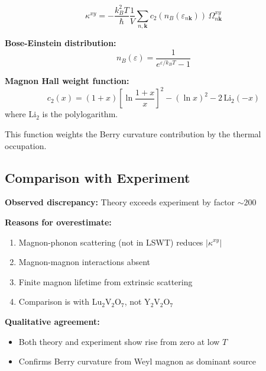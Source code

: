 \documentclass[11pt,letterpaper]{article}
\begin{document}
\begin{equation}
\boxed{
\kappa^{xy} = -\frac{k_B^2 T}{\hbar} \frac{1}{V} \sum_{n,\bm{k}} c_2(n_B(\varepsilon_{n\bm{k}})) \, \Omega_{n\bm{k}}^{xy}
}
\end{equation}

\begin{derivation}[title={Component Definitions}]
\textbf{Bose-Einstein distribution:}
\begin{equation}
n_B(\varepsilon) = \frac{1}{e^{\varepsilon/k_B T} - 1}
\end{equation}

\textbf{Magnon Hall weight function:}
\begin{equation}
c_2(x) = (1+x)\left[\ln\frac{1+x}{x}\right]^2 - (\ln x)^2 - 2\,\text{Li}_2(-x)
\end{equation}
where $\text{Li}_2$ is the polylogarithm.

This function weights the Berry curvature contribution by the thermal occupation.
\end{derivation}

\subsection{Comparison with Experiment}

\begin{assumption}[title={Limitations of LSWT Magnon Hall Calculation}]
\textbf{Observed discrepancy:} Theory exceeds experiment by factor $\sim 200$

\textbf{Reasons for overestimate:}
\begin{enumerate}
    \item Magnon-phonon scattering (not in LSWT) reduces $|\kappa^{xy}|$
    \item Magnon-magnon interactions absent
    \item Finite magnon lifetime from extrinsic scattering
    \item Comparison is with Lu$_2$V$_2$O$_7$, not Y$_2$V$_2$O$_7$
\end{enumerate}

\textbf{Qualitative agreement:}
\begin{itemize}
    \item Both theory and experiment show rise from zero at low $T$
    \item Confirms Berry curvature from Weyl magnon as dominant source
\end{itemize}
\end{assumption}
\end{document}
